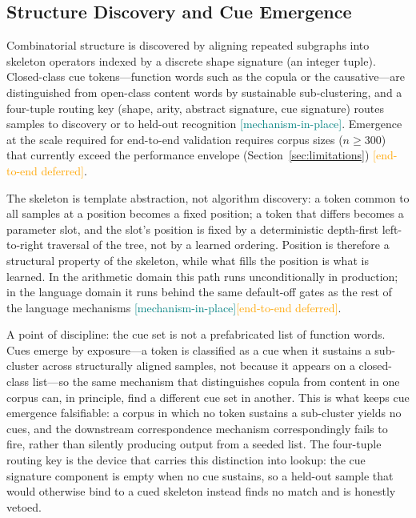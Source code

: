 \documentclass[11pt,a4paper]{article}
\newcommand{\statusmech}{\textcolor{teal}{\small\textsf{[mechanism-in-place]}}}
\newcommand{\statusdeferred}{\textcolor{orange}{\small\textsf{[end-to-end deferred]}}}
\begin{document}
\subsection{Structure Discovery and Cue Emergence}
\label{sec:mech-discovery}
Combinatorial structure is discovered by aligning repeated subgraphs
into skeleton operators indexed by a discrete shape signature (an
integer tuple). Closed-class cue tokens---function words such as the
copula or the causative---are distinguished from open-class content
words by sustainable sub-clustering, and a four-tuple routing key
(shape, arity, abstract signature, cue signature) routes samples to
discovery or to held-out recognition \statusmech. Emergence at the
scale required for end-to-end validation requires corpus sizes
($n \geq 300$) that currently exceed the performance envelope
(Section~\ref{sec:limitations}) \statusdeferred.

The skeleton is template abstraction, not algorithm discovery: a token
common to all samples at a position becomes a fixed position; a token
that differs becomes a parameter slot, and the slot's position is fixed
by a deterministic depth-first left-to-right traversal of the tree, not
by a learned ordering. Position is therefore a structural property of the
skeleton, while what fills the position is what is learned. In the
arithmetic domain this path runs unconditionally in production; in the
language domain it runs behind the same default-off gates as the rest of
the language mechanisms \statusmech\statusdeferred.

A point of discipline: the cue set is not a prefabricated list of
function words. Cues emerge by exposure---a token is classified as a
cue when it sustains a sub-cluster across structurally aligned samples,
not because it appears on a closed-class list---so the same mechanism
that distinguishes copula from content in one corpus can, in principle,
find a different cue set in another. This is what keeps cue emergence
falsifiable: a corpus in which no token sustains a sub-cluster yields no
cues, and the downstream correspondence mechanism correspondingly
fails to fire, rather than silently producing output from a seeded list.
The four-tuple routing key is the device that carries this distinction
into lookup: the cue signature component is empty when no cue sustains,
so a held-out sample that would otherwise bind to a cued skeleton instead
finds no match and is honestly vetoed.
\end{document}
